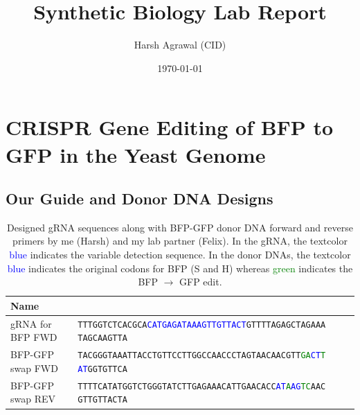 \documentclass[12pt,a4paper]{article}
\title{Synthetic Biology Lab Report}
\author{Harsh Agrawal (CID\: 02320622)}
\date{\today}
\begin{document}
\sloppy

\maketitle

\section{CRISPR Gene Editing of BFP to GFP in the Yeast Genome}
\subsection{Our Guide and Donor DNA Designs}

\begin{table}[h]
    \centering
    \begin{tabular}{|p{3cm}|p{11cm}|}
        \hline
        \textbf{Name}    & \textbf{\centering{Sequence}}                                                                                                        \\
        \hline
        gRNA for BFP FWD & \texttt{TTTGGTCTCACGCA\textcolor{blue}{CATGAGATAAAGTTGTTACT}GTTTTAGAGCTAGAAA
        TAGCAAGTTA}                                                                                                                                             \\
        \hline
        BFP-GFP swap FWD & \texttt{TACGGGTAAATTACCTGTTCCTTGGCCAACCCTAGTAACAACGTT\textcolor{green}{GA}\textcolor{blue}{CT}\textcolor{green}{T}
        \textcolor{blue}{AT}GGTGTTCA}                                                                                                                           \\
        \hline
        BFP-GFP swap REV & \texttt{TTTTCATATGGTCTGGGTATCTTGAGAAACATTGAACACC\textcolor{blue}{AT}\textcolor{green}{A}\textcolor{blue}{AG}\textcolor{green}{TC}AAC
        GTTGTTACTA}                                                                                                                                             \\
        \hline
    \end{tabular}
    \caption{Designed gRNA sequences along with BFP-GFP donor DNA forward and reverse primers by me (Harsh) and my lab partner (Felix). In the gRNA, the textcolor \textcolor{blue}{blue} indicates the variable detection sequence. In the donor DNAs, the textcolor \textcolor{blue}{blue} indicates the original codons for BFP (S and H) whereas \textcolor{green}{green} indicates the BFP $\rightarrow$ GFP edit.}\label{tab:gene_sequences_1}
\end{table}
\end{document}
